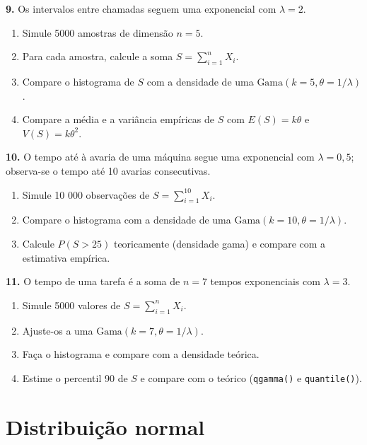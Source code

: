 \documentclass[
  portuguese,
  11pt,
  openany]{book}
\providecommand{\tightlist}{%
  \setlength{\itemsep}{0pt}\setlength{\parskip}{0pt}}
\begin{document}
\textbf{9.} Os intervalos entre chamadas seguem uma exponencial com \(\lambda = 2\).

\begin{enumerate}
\def\labelenumi{(\alph{enumi})}
\tightlist
\item
  Simule 5000 amostras de dimensão \(n = 5\).
\item
  Para cada amostra, calcule a soma \(S = \sum_{i=1}^n X_i\).
\item
  Compare o histograma de \(S\) com a densidade de uma \(\text{Gama}(k = 5, \theta = 1/\lambda)\).
\item
  Compare a média e a variância empíricas de \(S\) com \(E(S) = k\theta\) e \(V(S) = k\theta^2\).
\end{enumerate}

\textbf{10.} O tempo até à avaria de uma máquina segue uma exponencial com \(\lambda = 0{,}5\);
observa-se o tempo até 10 avarias consecutivas.

\begin{enumerate}
\def\labelenumi{(\alph{enumi})}
\tightlist
\item
  Simule 10 000 observações de \(S = \sum_{i=1}^{10} X_i\).
\item
  Compare o histograma com a densidade de uma \(\text{Gama}(k = 10, \theta = 1/\lambda)\).
\item
  Calcule \(P(S > 25)\) teoricamente (densidade gama) e compare com a estimativa
  empírica.
\end{enumerate}

\textbf{11.} O tempo de uma tarefa é a soma de \(n = 7\) tempos exponenciais com \(\lambda = 3\).

\begin{enumerate}
\def\labelenumi{(\alph{enumi})}
\tightlist
\item
  Simule 5000 valores de \(S = \sum_{i=1}^n X_i\).
\item
  Ajuste-os a uma \(\text{Gama}(k = 7, \theta = 1/\lambda)\).
\item
  Faça o histograma e compare com a densidade teórica.
\item
  Estime o percentil 90 de \(S\) e compare com o teórico (\texttt{qgamma()} e \texttt{quantile()}).
\end{enumerate}

\section{Distribuição normal}\label{distribuiuxe7uxe3o-normal}
\end{document}
